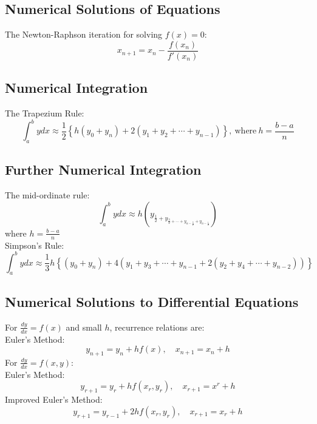     \subsection{Numerical Solutions of Equations}
        The Newton-Raphson iteration for solving $f(x)=0$:
        \begin{equation}
            x_{n+1}=x_n-\frac{f(x_n)}{f'(x_n)}
        \end{equation}

    \subsection{Numerical Integration}
        The Trapezium Rule:
        \begin{equation}
            \int_a^bydx\approx\frac{1}{2}\left\{h(y_0+y_n)+2(y_1+y_2+\cdots+y_{n-1})\right\},\ \text{where}\ h=\frac{b-a}{n}
        \end{equation}
    
    \subsection{Further Numerical Integration}
        The mid-ordinate rule:
        \begin{equation}
            \int_a^bydx\approx h\left(y_{\frac{1}{2}+y_{\frac{3}{2}+\cdots+y_{n-\frac{3}{2}}+y_{n-\frac{1}{2}}}}\right)
        \end{equation}
        where $h=\frac{b-a}{n}$ \\
        Simpson's Rule:
        \begin{equation}
            \int_a^bydx\approx\frac{1}{3}h\left\{(y_0+y_n)+4(y_1+y_3+\cdots+y_{n-1}+2(y_2+y_4+\cdots+y_{n-2}))\right\}
        \end{equation}

    \subsection{Numerical Solutions to Differential Equations}
        For $\frac{dy}{dx}=f(x)$ and small $h$, recurrence relations are: \\
        Euler's Method:
        \begin{equation}
            y_{n+1}=y_n+hf(x),\quad x_{n+1}=x_n+h
        \end{equation}
        For $\frac{dy}{dx}=f(x,y)$: \\
        Euler's Method:
        \begin{equation}
            y_{r+1}=y_r+hf(x_r,y_r),\quad x_{r+1}=x^r+h
        \end{equation}
        Improved Euler's Method:
        \begin{equation}
            y_{r+1}=y_{r-1}+2hf(x_r,y_r),\quad x_{r+1}=x_r+h
        \end{equation}

